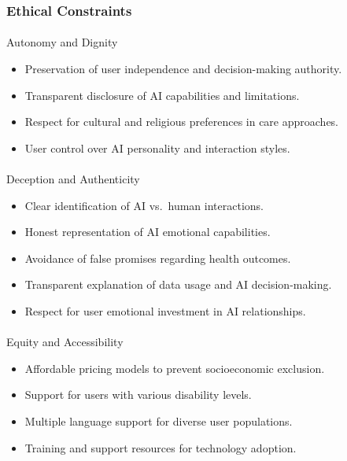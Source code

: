 \documentclass[
  letterpaper,
  DIV=11,
  numbers=noendperiod]{scrartcl}
\makeatletter
\let\oldparagraph\paragraph
\renewcommand{\paragraph}{
    \@ifstar
      \xxxParagraphStar
      \xxxParagraphNoStar
  }
\newcommand{\xxxParagraphStar}[1]{\oldparagraph*{#1}\mbox{}}
\newcommand{\xxxParagraphNoStar}[1]{\oldparagraph{#1}\mbox{}}
\providecommand{\tightlist}{%
  \setlength{\itemsep}{0pt}\setlength{\parskip}{0pt}}\usepackage{longtable,booktabs,array}
\makeatother
\begin{document}
\subsubsection{Ethical Constraints}\label{ethical-constraints}

\paragraph{Autonomy and Dignity}\label{autonomy-and-dignity}

\begin{itemize}
\tightlist
\item
  Preservation of user independence and decision-making authority.
\item
  Transparent disclosure of AI capabilities and limitations.
\item
  Respect for cultural and religious preferences in care approaches.
\item
  User control over AI personality and interaction styles.
\end{itemize}

\paragraph{Deception and Authenticity}\label{deception-and-authenticity}

\begin{itemize}
\tightlist
\item
  Clear identification of AI vs.~human interactions.
\item
  Honest representation of AI emotional capabilities.
\item
  Avoidance of false promises regarding health outcomes.
\item
  Transparent explanation of data usage and AI decision-making.
\item
  Respect for user emotional investment in AI relationships.
\end{itemize}

\paragraph{Equity and Accessibility}\label{equity-and-accessibility}

\begin{itemize}
\tightlist
\item
  Affordable pricing models to prevent socioeconomic exclusion.
\item
  Support for users with various disability levels.
\item
  Multiple language support for diverse user populations.
\item
  Training and support resources for technology adoption.
\end{itemize}
\end{document}
